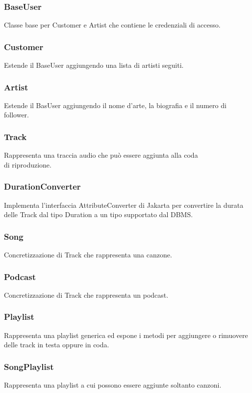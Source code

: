 \documentclass{article}
\begin{document}
  \subsubsection{BaseUser}
  Classe base per Customer e Artist che contiene le credenziali di accesso.
  \subsubsection{Customer}
  Estende il BaseUser aggiungendo una lista di artisti seguiti.
  \subsubsection{Artist}
  Estende il BasUser aggiungendo il nome d'arte, la biografia e il numero di follower.
  \subsubsection{Track}
  Rappresenta una traccia audio che può essere aggiunta alla coda\\ di riproduzione.

  \subsubsection{DurationConverter}
  Implementa l'interfaccia AttributeConverter di Jakarta per convertire la durata delle Track dal tipo Duration a un tipo supportato dal DBMS.
  \subsubsection{Song}
  Concretizzazione di Track che rappresenta una canzone.
  \subsubsection{Podcast}
  Concretizzazione di Track che rappresenta un podcast.
  \subsubsection{Playlist}
  Rappresenta una playlist generica ed espone i metodi per aggiungere o rimuovere\\ delle track in testa oppure in coda.

  \subsubsection{SongPlaylist}
  Rappresenta una playlist a cui possono essere aggiunte soltanto canzoni.
\end{document}
